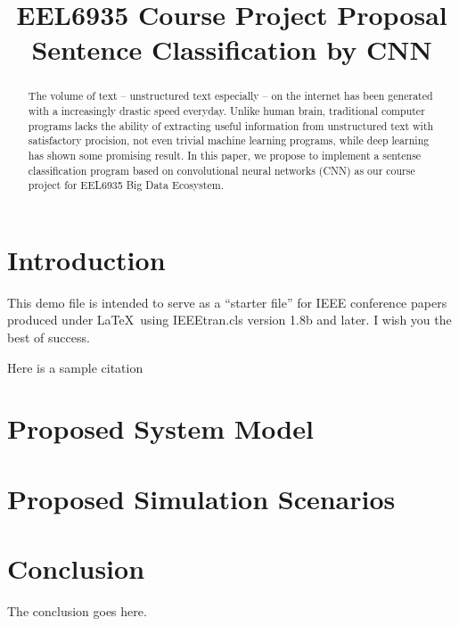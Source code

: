 \documentclass[conference]{IEEEtran}
\begin{document}
\title{EEL6935 Course Project Proposal \\
    Sentence Classification by CNN}
\author{
}

\maketitle

\begin{abstract}
    The volume of text -- unstructured text especially --  on the internet 
    has been generated with a increasingly drastic speed everyday. Unlike 
    human brain, traditional computer programs lacks the ability of extracting
    useful information from unstructured text with satisfactory procision, 
    not even trivial machine learning programs, while deep learning has shown 
    some promising result. In this paper, we propose to implement a sentense
    classification program based on convolutional neural networks (CNN) as 
    our course project for EEL6935 Big Data Ecosystem. 
\end{abstract}

\IEEEpeerreviewmaketitle

\section{Introduction}
    This demo file is intended to serve as a ``starter file''
    for IEEE conference papers produced under \LaTeX\ using
    IEEEtran.cls version 1.8b and later.
    I wish you the best of success.

    Here is a sample citation \cite{young2017recent}

\section{Proposed System Model}

\section{Proposed Simulation Scenarios}

\section{Conclusion}
The conclusion goes here.



\end{document}
